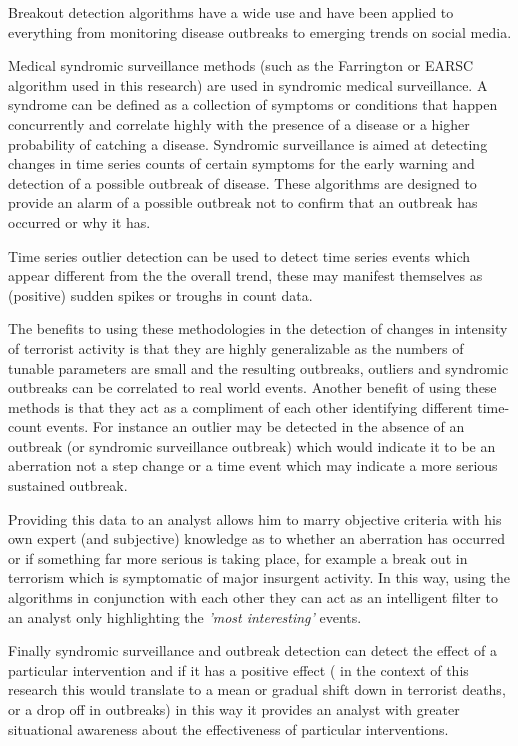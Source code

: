 Breakout detection algorithms have a wide use and have been applied to everything from monitoring disease outbreaks to emerging trends on social media.

Medical syndromic surveillance methods (such as the Farrington or EARSC algorithm used in this research) are used in syndromic medical surveillance. A syndrome can be defined as a collection of symptoms or conditions that happen concurrently and correlate highly with the presence of a disease or a higher probability of catching a disease. Syndromic surveillance is aimed at detecting changes in time series counts of certain symptoms for the early warning and detection of a possible outbreak of disease. These algorithms are designed to provide an alarm of a possible outbreak not to confirm that an outbreak has occurred or why it has.

Time series outlier detection can be used to detect time series events which appear different from the the overall trend, these may manifest themselves as (positive) sudden spikes or troughs in count data.

The benefits to using these methodologies in the detection of changes in intensity of terrorist activity is that they are highly generalizable as the numbers of tunable parameters are small and the resulting outbreaks, outliers and syndromic outbreaks can be correlated to real world events. Another benefit of using these methods is that they act as a compliment of each other
identifying different time-count events. For instance an outlier may be detected in the absence of an outbreak (or syndromic surveillance outbreak) which would indicate it to be an aberration not a step change or a time event which may indicate a more serious sustained outbreak.

Providing this data to an analyst allows him to marry objective criteria with his own expert (and subjective) knowledge as to whether an aberration has occurred or if something far more serious is taking place, for example a break out in terrorism which is symptomatic of major insurgent activity. In this way, using the algorithms in conjunction with each other they can act as an intelligent filter to an analyst only highlighting the \textit{'most interesting'} events. 

Finally syndromic surveillance and outbreak detection can detect the effect of a particular intervention and if it has a positive effect ( in the context of this research this would translate to a mean or gradual shift down in terrorist deaths, or a drop off in outbreaks) in this  way it provides an analyst with greater situational awareness about the effectiveness of particular interventions. 

